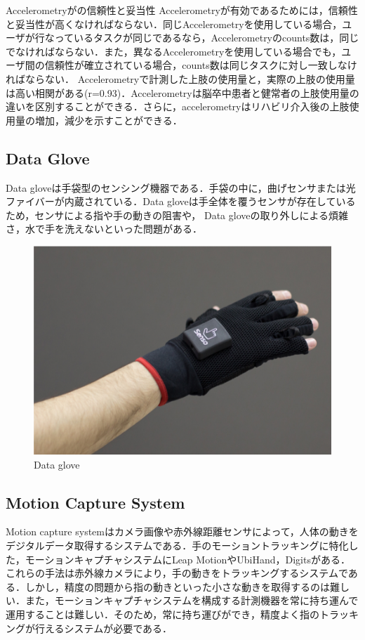 Accelerometryがの信頼性と妥当性
Accelerometryが有効であるためには，信頼性と妥当性が高くなければならない．\cite{}同じAccelerometryを使用している場合，ユーザが行なっているタスクが同じであるなら，Accelerometryのcounts数は，同じでなければならない．また，異なるAccelerometryを使用している場合でも，ユーザ間の信頼性が確立されている場合，counts数は同じタスクに対し一致しなければならない．
Accelerometryで計測した上肢の使用量と，実際の上肢の使用量は高い相関がある(r=0.93)．Accelerometryは脳卒中患者と健常者の上肢使用量の違いを区別することができる．さらに，accelerometryはリハビリ介入後の上肢使用量の増加，減少を示すことができる．





\subsection*{Data Glove}
Data glove\cite{Lin2018,Tarchanidis2003}は手袋型のセンシング機器である．手袋の中に，曲げセンサまたは光ファイバーが内蔵されている．Data gloveは手全体を覆うセンサが存在しているため，センサによる指や手の動きの阻害や，
Data gloveの取り外しによる煩雑さ，水で手を洗えないといった問題がある．

\begin{figure}[H]
  \centering
  \includegraphics[width=0.6\linewidth]{fig/ch1/dataglove}
  \caption{Data glove}
  \label{fig:Data glove}
\end{figure}

\subsection*{Motion Capture System}
Motion capture systemはカメラ画像や赤外線距離センサによって，人体の動きをデジタルデータ取得するシステムである．手のモーショントラッキングに特化した，モーションキャプチャシステムにLeap MotionやUbiHand，Digits\cite{Ahmad2006,Kim2012}がある．これらの手法は赤外線カメラにより，手の動きをトラッキングするシステムである．しかし，精度の問題から指の動きといった小さな動きを取得するのは難しい．また，モーションキャプチャシステムを構成する計測機器を常に持ち運んで運用することは難しい．そのため，常に持ち運びができ，精度よく指のトラッキングが行えるシステムが必要である．

